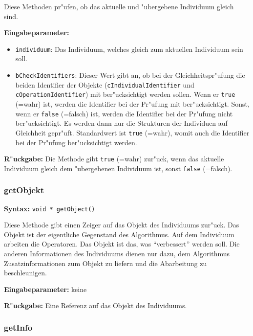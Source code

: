 \bigskip\noindent
Diese Methoden pr"ufen, ob das aktuelle und "ubergebene Individuum gleich sind.

\bigskip\noindent
\textbf{Eingabeparameter:}
\begin{itemize}
 \item \verb|individuum|: Das Individuum, welches gleich zum aktuellen Individuum sein soll.
 \item \verb|bCheckIdentifiers|: Dieser Wert gibt an, ob bei der Gleichheitspr"ufung die beiden Identifier der Objekte (\verb|cIndividualIdentifier| und \verb|cOperationIdentifier|) mit ber"ucksichtigt werden sollen. Wenn er \verb|true| (=wahr) ist, werden die Identifier bei der Pr"ufung mit ber"ucksichtigt. Sonst, wenn er \verb|false| (=falsch) ist, werden die Identifier bei der Pr"ufung nicht ber"ucksichtigt. Es werden dann nur die Strukturen der Individuen auf Gleichheit gepr"uft. Standardwert ist \verb|true| (=wahr), womit auch die Identifier bei der Pr"ufung ber"ucksichtigt werden.
\end{itemize}

\bigskip\noindent
\textbf{R"uckgabe:} Die Methode gibt \verb|true| (=wahr) zur"uck, wenn das aktuelle Individuum gleich dem "ubergebenen Individuum ist, sonst \verb|false| (=falsch).


\subsubsection{getObjekt}

\textbf{Syntax:} \verb|void * getObject()|

\bigskip\noindent
Diese Methode gibt einen Zeiger auf das Objekt des Individuums zur"uck. Das Objekt ist der eigentliche Gegenstand des Algorithmus. Auf dem Individuum arbeiten die Operatoren. Das Objekt ist das, was ``verbessert'' werden soll. Die anderen Informationen des Individuums dienen nur dazu, dem Algorithmus Zusatzinformationen zum Objekt zu liefern und die Abarbeitung zu beschleunigen.

\bigskip\noindent
\textbf{Eingabeparameter:} keine

\bigskip\noindent
\textbf{R"uckgabe:} Eine Referenz auf das Objekt des Individuums.


\subsubsection{getInfo}

